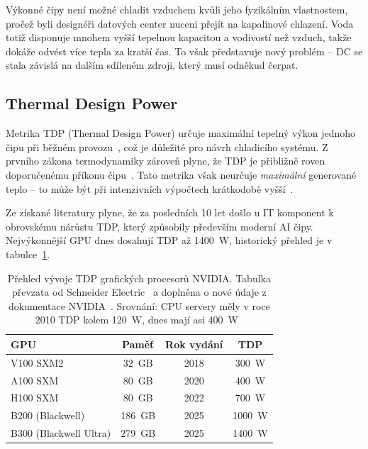 Výkonné čipy není možné chladit vzduchem kvůli jeho fyzikálním vlastnostem, pročež byli designéři datových center nuceni přejít na kapalinové chlazení. Voda totiž disponuje mnohem vyšší tepelnou kapacitou a vodivostí než vzduch, takže dokáže odvést více tepla za kratší čas. To však představuje nový problém -- DC se stala závislá na dalším sdíleném zdroji, který musí odněkud čerpat.

\subsection{Thermal Design Power}
\label{sec:tdp}

Metrika TDP (Thermal Design Power) určuje maximální tepelný výkon jednoho čipu při běžném provozu~\cite{mahajan_cooling_2006}, což je důležité pro návrh chladicího systému. Z prvního zákona termodynamiky zároveň plyne, že TDP je přibližně roven doporučenému příkonu čipu~\cite{avelar_ai_2023}. Tato metrika však neurčuje \textit{maximální} generované teplo -- to může být při intenzivních výpočtech krátkodobě vyšší~\cite{gigabyte_tdp_2026}.

Ze získané literatury plyne, že za posledních 10 let došlo u IT komponent k obrovskému nárůstu TDP, který způsobily především moderní AI čipy. Nejvýkonnější GPU dnes dosahují TDP až 1400~W, historický přehled je v tabulce~\ref{tab:gpu_tdp}. 

\begin{table}[b] \centering

    \caption[Přehled vývoje TDP]{Přehled vývoje TDP grafických procesorů NVIDIA. Tabulka převzata od Schneider Electric~\cite{avelar_ai_2023} a doplněna o nové údaje z dokumentace NVIDIA~\cite{nvidia_nvidia_2025, nvidia_nvidia_2025-1}. Srovnání: CPU servery měly v roce 2010 TDP kolem 120~W, dnes mají asi 400~W~\cite{bizo_silicon_2022}}
    \label{tab:gpu_tdp}

    \begin{tabular}{lccc}
        \toprule
        \textbf{GPU} & \textbf{Paměť} & \textbf{Rok vydání} & \textbf{TDP} \\
        \midrule
         V100 SXM2 & 32~GB & 2018 & 300~W \\
         A100 SXM & 80~GB & 2020 & 400~W \\
         H100 SXM & 80~GB & 2022 & 700~W \\
         B200 (Blackwell) & 186~GB & 2025 & 1000~W \\
         B300 (Blackwell Ultra) & 279~GB & 2025 & 1400~W \\
        \bottomrule
    \end{tabular}

\end{table}

